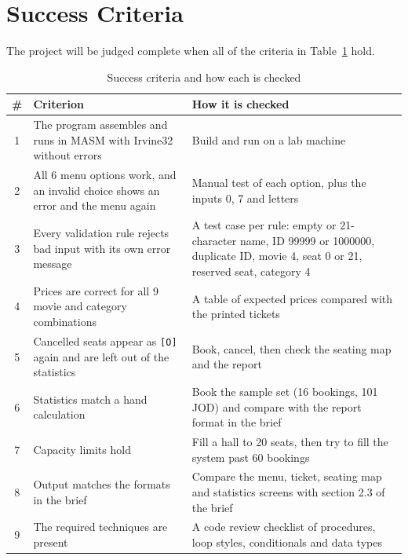 \documentclass{thesis-library}
\newcommand{\tablefont}{\footnotesize\setstretch{1.15}\hyphenpenalty=10000\relax}
\begin{document}
\section{Success Criteria}

The project will be judged complete when all of the criteria in Table~\ref{tab:success} hold.

\begin{table}[htbp]
\centering
\caption{Success criteria and how each is checked}
\label{tab:success}
\tablefont
\begin{tabular}{|c|>{\raggedright\arraybackslash}p{6cm}|>{\raggedright\arraybackslash}p{7.2cm}|}
\hline
\textbf{\#} & \textbf{Criterion} & \textbf{How it is checked} \\ \hline
1 & The program assembles and runs in MASM with Irvine32 without errors & Build and run on a lab machine \\ \hline
2 & All 6 menu options work, and an invalid choice shows an error and the menu again & Manual test of each option, plus the inputs 0, 7 and letters \\ \hline
3 & Every validation rule rejects bad input with its own error message & A test case per rule: empty or 21-character name, ID 99999 or 1000000, duplicate ID, movie 4, seat 0 or 21, reserved seat, category 4 \\ \hline
4 & Prices are correct for all 9 movie and category combinations & A table of expected prices compared with the printed tickets \\ \hline
5 & Cancelled seats appear as \texttt{[O]} again and are left out of the statistics & Book, cancel, then check the seating map and the report \\ \hline
6 & Statistics match a hand calculation & Book the sample set (16 bookings, 101 JOD) and compare with the report format in the brief \\ \hline
7 & Capacity limits hold & Fill a hall to 20 seats, then try to fill the system past 60 bookings \\ \hline
8 & Output matches the formats in the brief & Compare the menu, ticket, seating map and statistics screens with section 2.3 of the brief \\ \hline
9 & The required techniques are present & A code review checklist of procedures, loop styles, conditionals and data types \\ \hline
\end{tabular}
\end{table}

\end{document}
